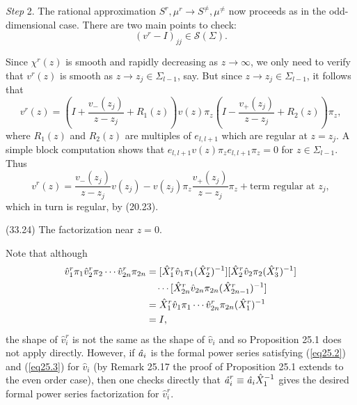 \documentclass{surv-l}
\theoremstyle{plain}
\theoremstyle{definition}
\numberwithin{equation}{chapter}
\begin{document}
\emph{Step} 2. The rational approximation $S^{r},\mu^{r}\rightarrow S^{\neq}, \mu^{\neq}$ now proceeds as in the odd-dimensional case. There are two main points to check:
\begin{equation}\label{eq33.23}
(v^{r}-I)_{jj}\in\mathscr{S}(\Sigma).
\end{equation}


Since $\chi^{r}(z)$ is smooth and rapidly decreasing as $ z\rightarrow\infty$, we only need to verify that $v^{r}(z)$ is smooth as $z\rightarrow z_{j}\in\Sigma_{l-1}$, say. But since $z\rightarrow z_{j}\in\Sigma_{l-1}$, it follows that
\begin{equation*}
v^{r}(z)=\left(I+\frac{v_{-}(z_{j})}{z-z_{j}}+R_{1}(z)\right)v(z)\pi_{z}\left(I-\frac{v_{+}(z_{j})}{z-z_{j}}+R_{2}(z)\right)\pi_{z},
\end{equation*}
where $R_{1}(z)$ and $R_{2}(z)$ are multiples of $e_{l,l+1}$ which are regular at $z=z_{j}$. A simple block computation shows that $e_{l,l+1}v(z)\pi_{z}e_{l,l+1}\pi_{z}=0$ for $z\in\Sigma_{l-1}$.\\
Thus
\begin{equation*}
v^{r}(z)=\displaystyle \frac{v_{-}(z_{j})}{z-z_{j}}v(z_{j})-v(z_{j})\pi_{z}\frac{v_{+}(z_{j})}{z-z_{j}}\pi_{z}+ \text{term regular at } z_{j},
\end{equation*}
which in turn is regular, by (20.23).

(33.24) The factorization near $z=0$.

Note that although
\begin{align*}
\hat{v}_{1}^{r}\pi_{1}\hat{v}_{2}^{r}\pi_{2}\cdots \hat{v}_{2n}^{r}\pi_{2n}&=[\hat{X}_{1}^{r}\hat{v}_{1}\pi_{1}(\hat{X}_{2}^{r})^{-1}][\hat{X}_{2}^{r}\hat{v}_{2}\pi_{2}(\hat{X}_{3}^{r})^{-1}]\\
&\quad\cdots[\hat{X}_{2n}^{r}\hat{v}_{2n}\pi_{2n}(\hat{X}_{2n-1}^{r})^{-1}]\\ \notag
&=\hat{X}_{1}^{r}\hat{v}_{1}\pi_{1}\cdots\hat{v}_{2n}^{r}\pi_{2n}(\hat{X}_{1}^{r})^{-1}\\ \notag
&=I, \notag
\end{align*}
the shape of $\hat{v}_{i}^{r}$ is not the same as the shape of $\hat{v}_{i}$ and so Proposition 25.1 does not apply directly. However, if $\text{\emph{\^{a}}}_{i}$ is the formal power series satisfying (\ref{eq25.2}) and (\ref{eq25.3}) for $\hat{v}_{i}$ (by Remark 25.17 the proof of Proposition 25.1 extends to the even order case), then one checks directly that $\text{\emph{\^{a}}}_{i}^{r}\equiv\text{\emph{\^{a}}}_{i}\hat{X}_{1}^{-1}$ gives the desired formal power series factorization for $\hat{v}_{i}^{r}$.
\end{document}
